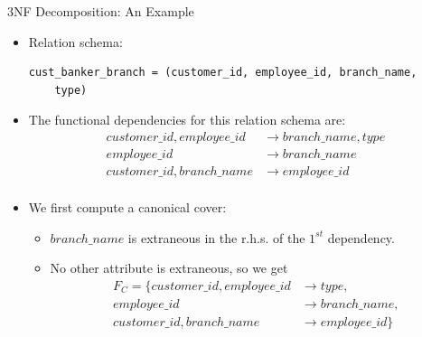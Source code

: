 \documentclass{beamer}
\begin{document}
\begin{frame}[fragile]{3NF Decomposition: An Example}
    \footnotesize
    \begin{itemize}
        \item Relation schema:
            \begin{verbatim}
cust_banker_branch = (customer_id, employee_id, branch_name,
    type)
            \end{verbatim}
            \vspace{-5mm}
        \item The functional dependencies for this relation schema are:
            \begin{equation*}
                \begin{align*}
                    customer\_id, employee\_id &\rightarrow branch\_name, type \\
                    employee\_id &\rightarrow branch\_name \\
                    customer\_id, branch\_name &\rightarrow employee\_id \\
                \end{align*}
            \end{equation*}
        \item We first compute a canonical cover:
            \begin{itemize}
                \item $branch\_name$ is extraneous in the r.h.s. of the $1^{st}$ dependency.
                \item No other attribute is extraneous, so we get
                    \begin{equation*}
                        \begin{align*}
                            F_C = \{ customer\_id, employee\_id & \rightarrow type, \\
                                  employee\_id & \rightarrow branch\_name, \\
                                  customer\_id, branch\_name & \rightarrow employee\_id \}
                        \end{align*}
                    \end{equation*}
            \end{itemize}
    \end{itemize}
\end{frame}
\end{document}
